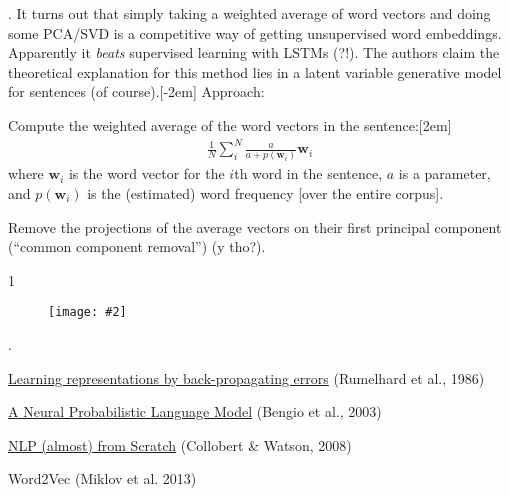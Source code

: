 \documentclass[11pt]{article}
\renewcommand\vec[2][]{\bm{#2}_{#1}}
\newcommand\myfig[2][0.3\textwidth]{\begin{figure}[h!]\centering\texttt{[image: \#2]}\end{figure}}
\newcommand\myspace[1][]{\vspace{#1\bigskipamount}}
\newcommand\p{\Needspace{10\baselineskip} \noindent}
\begin{document}
\myspace
\p {}. It turns out that simply taking a weighted average of word vectors and doing some PCA/SVD is a competitive way of getting unsupervised word embeddings. Apparently it \textit{beats} supervised learning with LSTMs (?!). The authors claim the theoretical explanation for this method lies in a latent variable generative model for sentences (of course).[-2em] Approach:
\begin{compactenum}
	\item Compute the weighted average of the word vectors in the sentence:[2em]
	\begin{align}
		\frac{1}{N} \sum_{i}^{N} \frac{a}{a + p(\vec[i]{w})} \vec[i]{w}
	\end{align}
	where $\vec[i]{w}$ is the word vector for the $i$th word in the sentence, $a$ is a parameter, and $p(\vec[i]{w})$ is the (estimated) word frequency [over the entire corpus]. 
	
	\item Remove the projections of the average vectors on their first principal component (``common component removal'') (y tho?).
\end{compactenum}

1\myfig[0.8\textwidth]{AroraEmbeddingAlg.png}




\myspace
\p {}. 
\begin{compactitem}
	\item \href{https://www.iro.umontreal.ca/~vincentp/ift3395/lectures/backprop_old.pdf}{Learning representations by back-propagating errors} (Rumelhard et al., 1986)
	
	\item \href{http://www.jmlr.org/papers/volume3/bengio03a/bengio03a.pdf}{A Neural Probabilistic Language Model} (Bengio et al., 2003)
	
	\item \href{https://arxiv.org/abs/1103.0398}{NLP (almost) from Scratch} (Collobert \& Watson, 2008)
	
	\item Word2Vec (Miklov et al. 2013)
\end{compactitem}





\end{document}
